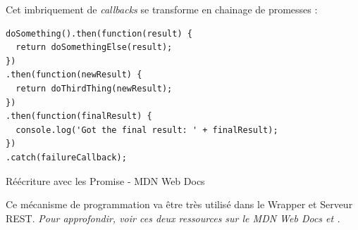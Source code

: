 \documentclass[a4paper, 12pt]{article}
\newenvironment{code}{\captionsetup{type=listing}}{}
\begin{document}
\bigbreak
Cet imbriquement de \textit{callbacks} se transforme en chainage de promesses : \\
\begin{code}
    \begin{verbatim}
doSomething().then(function(result) {
  return doSomethingElse(result);
})
.then(function(newResult) {
  return doThirdThing(newResult);
})
.then(function(finalResult) {
  console.log('Got the final result: ' + finalResult);
})
.catch(failureCallback);
    \end{verbatim}
    \caption{Réécriture avec les Promise - MDN Web Docs \cite{ref102}}
\end{code}
\bigbreak
Ce mécanisme de programmation va être très utilisé dans le Wrapper et Serveur REST.
\textit{Pour approfondir, voir ces deux ressources sur le MDN Web Docs \cite{ref100} et \cite{ref102}.}

\newpage
\end{document}
